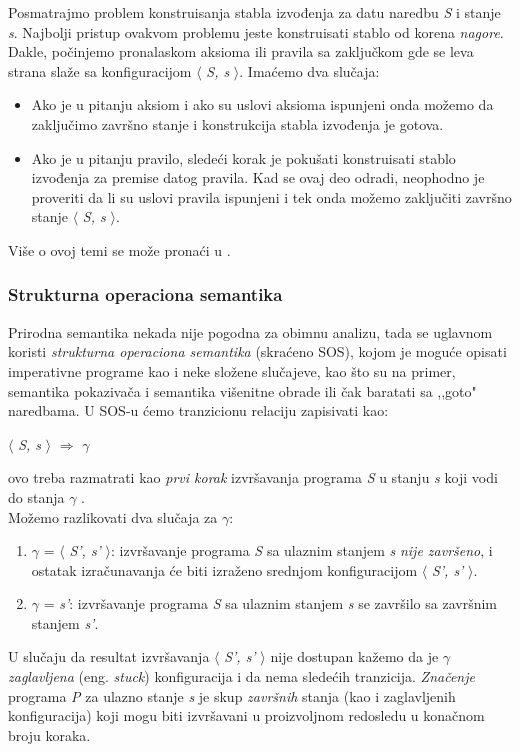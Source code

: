 \documentclass[a4paper]{article}
\begin{document}
{Posmatrajmo problem konstruisanja stabla izvođenja za datu naredbu \textit{S} i stanje \textit{s}. Najbolji pristup ovakvom problemu jeste konstruisati stablo od korena \textit{nagore}. Dakle, počinjemo pronalaskom aksioma ili pravila sa zaključkom gde se leva strana slaže sa konfiguracijom $\langle$ \textit{S, s} $\rangle$. Imaćemo dva slučaja:
\begin{itemize}
	\item Ako je u pitanju aksiom i ako su uslovi aksioma ispunjeni onda možemo da zaključimo završno stanje i konstrukcija stabla izvođenja je gotova.
	\item Ako je u pitanju pravilo, sledeći korak je pokušati konstruisati stablo izvođenja za premise datog pravila. Kad se ovaj deo odradi, neophodno je proveriti da li su uslovi pravila ispunjeni i tek onda možemo zaključiti završno stanje  $\langle$ \textit{S, s} $\rangle$.
\end{itemize}
Više o ovoj temi se može pronaći u \cite{wiley, opersem}.

\subsubsection{Strukturna operaciona semantika}
Prirodna semantika nekada nije pogodna za obimnu analizu, tada se uglavnom koristi \textit{strukturna operaciona semantika} (skraćeno SOS), kojom je moguće opisati imperativne programe kao i neke složene slučajeve, kao što su na primer, semantika pokazivača i semantika višenitne obrade ili čak baratati sa ,,goto" naredbama. U SOS-u ćemo tranzicionu relaciju zapisivati kao:
\begin{center} $\langle$ \textit{S, s} $\rangle$ $\Longrightarrow$ \textit{$\gamma$} \end{center}
ovo treba razmatrati kao {\em prvi korak} izvršavanja programa \textit{S} u stanju \textit{s} koji vodi do stanja \textit{$\gamma$} \cite{opersem}.\\
Možemo razlikovati dva slučaja za $\gamma$:
\begin{enumerate}
	\item $\gamma$ = $\langle$ \textit{S', s'} $\rangle$: izvršavanje programa \textit{S} sa ulaznim stanjem \textit{s} {\em nije završeno}, i ostatak izračunavanja će biti izraženo srednjom konfiguracijom $\langle$ \textit{S', s'} $\rangle$.
	\item $\gamma$ = \textit{s'}: izvršavanje programa \textit{S} sa ulaznim stanjem \textit{s} se završilo sa završnim stanjem \textit{s'}.
\end{enumerate}
U slučaju da resultat izvršavanja $\langle$ \textit{S', s'} $\rangle$ nije dostupan kažemo da je $\gamma$ \textit{zaglavljena} (eng. {\em stuck}) konfiguracija i da nema sledećih tranzicija. \textit{Značenje} programa \textit{P} za ulazno stanje \textit{s} je skup \textit{završnih} stanja (kao i zaglavljenih konfiguracija) koji mogu biti izvršavani u proizvoljnom redosledu u konačnom broju koraka.

}
\end{document}
